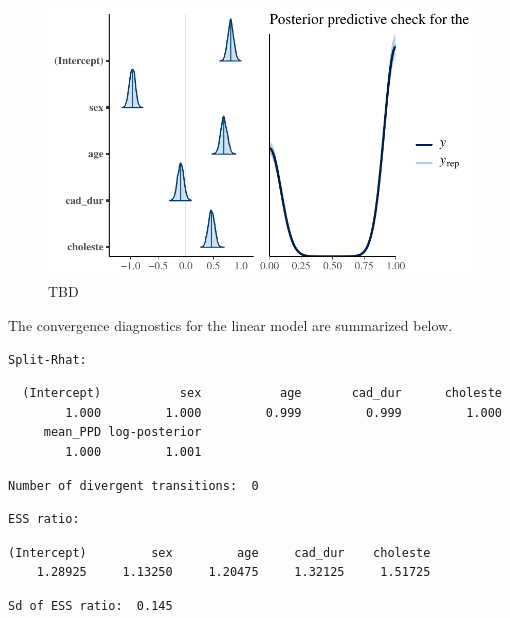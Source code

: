 \documentclass[
  letterpaper,
  DIV=11,
  numbers=noendperiod]{scrartcl}
\begin{document}
\begin{figure}

{\centering \includegraphics{project_final_files/figure-pdf/linear-model-pp-check-2.pdf}

}

\caption{TBD}

\end{figure}

The convergence diagnostics for the linear model are summarized below.

\begin{verbatim}
Split-Rhat:
\end{verbatim}

\begin{verbatim}
  (Intercept)           sex           age       cad_dur      choleste 
        1.000         1.000         0.999         0.999         1.000 
     mean_PPD log-posterior 
        1.000         1.001 
\end{verbatim}

\begin{verbatim}
Number of divergent transitions:  0 
\end{verbatim}

\begin{verbatim}
ESS ratio: 
\end{verbatim}

\begin{verbatim}
(Intercept)         sex         age     cad_dur    choleste 
    1.28925     1.13250     1.20475     1.32125     1.51725 
\end{verbatim}

\begin{verbatim}
Sd of ESS ratio:  0.145
\end{verbatim}
\end{document}
